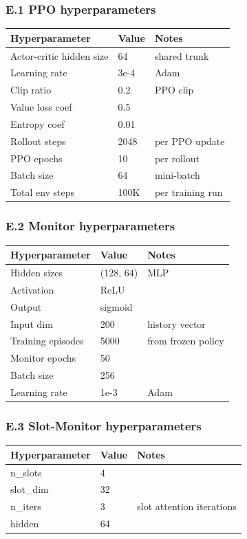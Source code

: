 \documentclass[11pt]{article}
\begin{document}
\subsubsection{E.1 PPO hyperparameters}

\begin{tabular}{lll}
Hyperparameter & Value & Notes \\
\hline
Actor-critic hidden size & 64 & shared trunk \\
Learning rate & 3e-4 & Adam \\
Clip ratio & 0.2 & PPO clip \\
Value loss coef & 0.5 &  \\
Entropy coef & 0.01 &  \\
Rollout steps & 2048 & per PPO update \\
PPO epochs & 10 & per rollout \\
Batch size & 64 & mini-batch \\
Total env steps & 100K & per training run \\
\end{tabular}


\subsubsection{E.2 Monitor hyperparameters}

\begin{tabular}{lll}
Hyperparameter & Value & Notes \\
\hline
Hidden sizes & (128, 64) & MLP \\
Activation & ReLU &  \\
Output & sigmoid &  \\
Input dim & 200 & history vector \\
Training episodes & 5000 & from frozen policy \\
Monitor epochs & 50 &  \\
Batch size & 256 &  \\
Learning rate & 1e-3 & Adam \\
\end{tabular}


\subsubsection{E.3 Slot-Monitor hyperparameters}

\begin{tabular}{lll}
Hyperparameter & Value & Notes \\
\hline
n\_slots & 4 &  \\
slot\_dim & 32 &  \\
n\_iters & 3 & slot attention iterations \\
hidden & 64 &  \\
\end{tabular}
\end{document}
